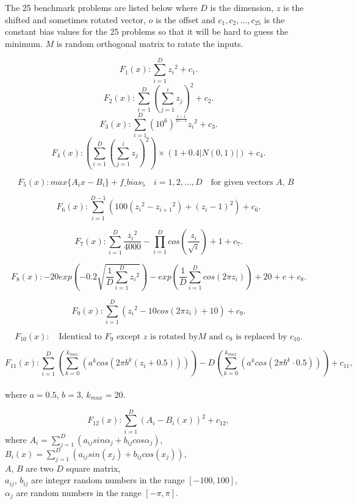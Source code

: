 The 25 benchmark problems are listed below where $D$ is the dimension,
$z$ is the shifted and sometimes rotated vector, $o$ is the offset and
$c_1,c_2,\ldots,c_{25}$ is the constant bias values for the 25 problems
so that it will be hard to guess the minimum.
$M$ is random orthogonal matrix to ratate the inputs.

\[F_1(x): \sum\limits_{i=1}^D {z_i}^2 + c_1.\]
\[F_2(x): \sum\limits_{i=1}^D\left(\sum\limits_{j=1}^i z_j\right)^2 +
c_2.\]
\[F_3(x): \sum\limits_{i=1}^D\left(10^6\right)^{\frac{i-1}{D-1}} {z_i}^2
+ c_3.\]
\[F_4(x): \left( \sum\limits_{i=1}^D\left(\sum\limits_{j=1}^i z_j\right)^2\right)
\times \left(1+0.4|N\left(0,1\right)| \right) + c_4.\]

\[F_5(x): max \{ {A_i}x-B_i \} + f\_bias_5 \quad i = 1,2,\ldots,D
\quad\text{for given vectors $A$, $B$ }\]

\[F_6(x): \sum\limits_{i=1}^{D-1} \left(
100\left({z_i}^2-{z_{i+1}}^2\right) + \left(z_i -1 \right) ^2 \right) +
c_6.\]

\[F_7(x): \sum\limits_{i=1}^D\frac{{z_i}^2}{4000} -
\prod\limits_{i=1}^Dcos\left(\frac{z_i}{\sqrt{i}}\right) +1 + c_7.\]

\[F_8(x):
  -20exp\left(-0.2\sqrt{\frac{1}{D}\sum\limits_{i=1}^D{z_i}^2}\right) -
exp\left(\frac{1}{D}\sum\limits_{i=1}^Dcos\left(2\pi z_i\right)\right)
+20 +e + c_8.\]


\[F_9(x): \sum\limits_{i=1}^D\left({z_i}^2 -10 cos\left(2\pi z_i
\right)+10 \right)+c_9.\]

\[F_{10}(x):\quad\text{Identical to $F_9$ except $z$ is rotated by
$M$ and $c_9$ is replaced by $c_{10}$.}\]

\[F_{11}(x):
  \sum\limits_{i=1}^D\left(\sum\limits_{k=0}^{k_{max}}\left(a^kcos\left(2\pi
  b^k\left(z_i + 0.5\right)\right)\right)\right) -
  D\left(\sum\limits_{k=0}^{k_{max}}\left(a^kcos\left(2\pi b^k \cdot
0.5\right)\right)\right) + c_{11},\]\quad\text\\ where $a = 0.5$, $b = 3$,
$k_{max}=20.$

\[F_{12}(x):\sum\limits_{i=1}^D\left(A_i-B_i\left(x\right)\right)^2+c_{12},\]
where $A_i =
\sum\limits_{j=1}^D\left(a_{ij}sin\alpha_j + b_{ij}cos\alpha_j\right)$,
$B_i(x) = \sum\limits_{j=1}^D\left(a_{ij}sin(x_j) +
b_{ij}cos(x_j)\right),$\\
$A$, $B$ are two $D$ square matrix,\\ $a_{ij}$, $b_{ij}$ are integer
random numbers in the range $[-100,100]$,\\ $\alpha_j$ are random numbers
in the range $[-\pi, \pi].$

